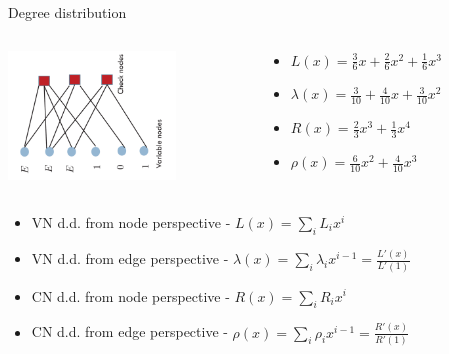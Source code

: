 \documentclass[10pt,xcolor=table]{beamer}
\begin{document}
\begin{frame}{Degree distribution}
\begin{columns}
\begin{column}{0.47\textwidth}
\begin{center}
\includegraphics[width=1.75in,angle=-90]{./Figures/Tannergraph63codestoppingset}
\end{center}
\end{column}
\begin{column}{0.47\textwidth}
\begin{itemize}
\item $L(x) = \frac{3}{6} x + \frac26 x^2 + \frac16 x^3$
\vspace{3mm}
\item $\lambda(x) = \frac{3}{10} + \frac{4}{10} x + \frac {3}{10} x^2$
\vspace{3mm}
\item $R(x) = \frac{2}{3}x^3 + \frac13 x^4$
\vspace{3mm}
\item $\rho(x) = \frac{6}{10} x^2+ \frac{4}{10} x^3$
\end{itemize}
\end{column}
\end{columns}

\begin{itemize}
\item VN d.d. from node perspective - $L(x) = \sum_i L_i x^i$
\vspace{1mm}
\item VN d.d. from edge perspective - $\lambda(x) = \sum_i \lambda_i x^{i-1} = \frac{L'(x)}{L'(1)}$
\vspace{1mm}
\item CN d.d. from node perspective - $R(x) = \sum_i R_i x^i$
\vspace{1mm}
\item CN d.d. from edge perspective - $\rho(x) =\sum_i \rho_i x^{i-1} = \frac{R'(x)}{R'(1)}$
\end{itemize}

\end{frame}
\end{document}

